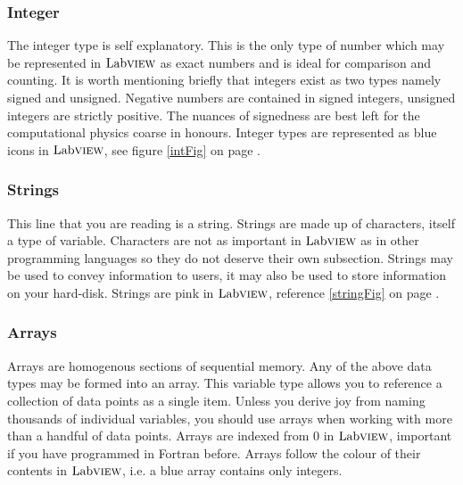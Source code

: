 	\subsubsection{Integer}
	The integer type is self explanatory. This is the only type of number which may be represented in $\text{Lab}\textsc{view}$ as exact numbers and is ideal for comparison and counting. It is worth mentioning briefly that integers exist as two types namely signed and unsigned. Negative numbers are contained in signed integers, unsigned integers are strictly positive. The nuances of signedness are best left for the computational physics coarse in honours. Integer types are represented as blue icons in $\text{Lab}\textsc{view}$, see figure \ref{intFig} on page \pageref{intFig}.
	\subsubsection{Strings}
	This line that you are reading is a string. Strings are made up of characters, itself a type of variable. Characters are not as important in $\text{Lab}\textsc{view}$ as in other programming languages so they do not deserve their own subsection. Strings may be used to convey information to users, it may also be used to store information on your hard-disk. Strings are pink in $\text{Lab}\textsc{view}$, reference \ref{stringFig} on page \pageref{stringFig}.
	\subsubsection{Arrays}
	\label{ch1Arrays}
	Arrays are homogenous sections of sequential memory. Any of the above data types may be formed into an array. This variable type allows you to reference a collection of data points as a single item. Unless you derive joy from naming thousands of individual variables, you should use arrays when working with more than a handful of data points. Arrays are indexed from 0 in $\text{Lab}\textsc{view}$, important if you have programmed in Fortran before. Arrays follow the colour of their contents in $\text{Lab}\textsc{view}$, i.e. a blue array contains only integers.
